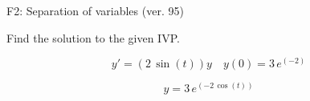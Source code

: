 \begin{exercise}
  \begin{exerciseTitle}F2: Separation of variables (ver. 95)\end{exerciseTitle}
  \begin{exerciseStatement}
    
Find the solution to the given IVP.

    
\[y'=( 2 \, \sin\left(t\right) )y\hspace{1em} y(0)= 3 \, e^{\left(-2\right)}\]

  \end{exerciseStatement}
  \begin{exerciseAnswer}
    
\[y= 3 \, e^{\left(-2 \, \cos\left(t\right)\right)}\]

  \end{exerciseAnswer}
\end{exercise}